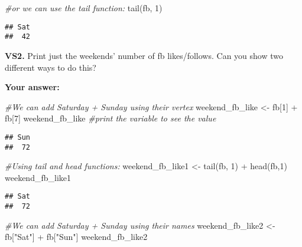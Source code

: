 \documentclass[
]{article}
\newenvironment{Shaded}{\begin{snugshade}}{\end{snugshade}}
\newcommand{\CommentTok}[1]{\textcolor[rgb]{0.56,0.35,0.01}{\textit{#1}}}
\newcommand{\DecValTok}[1]{\textcolor[rgb]{0.00,0.00,0.81}{#1}}
\newcommand{\FunctionTok}[1]{\textcolor[rgb]{0.00,0.00,0.00}{#1}}
\newcommand{\NormalTok}[1]{#1}
\newcommand{\OtherTok}[1]{\textcolor[rgb]{0.56,0.35,0.01}{#1}}
\newcommand{\SpecialCharTok}[1]{\textcolor[rgb]{0.00,0.00,0.00}{#1}}
\newcommand{\StringTok}[1]{\textcolor[rgb]{0.31,0.60,0.02}{#1}}
\begin{document}
\begin{Shaded}
\begin{Highlighting}[]
\CommentTok{\#or we can use the tail function:}
\FunctionTok{tail}\NormalTok{(fb, }\DecValTok{1}\NormalTok{)}
\end{Highlighting}
\end{Shaded}

\begin{verbatim}
## Sat 
##  42
\end{verbatim}

\textbf{VS2.} Print just the weekends' number of fb likes/follows. Can
you show two different ways to do this?

\textbf{Your answer:}

\begin{Shaded}
\begin{Highlighting}[]
\CommentTok{\#We can add Saturday + Sunday using their vertex}
\NormalTok{weekend\_fb\_like }\OtherTok{\textless{}{-}}\NormalTok{ fb[}\DecValTok{1}\NormalTok{] }\SpecialCharTok{+}\NormalTok{ fb[}\DecValTok{7}\NormalTok{]}
\NormalTok{weekend\_fb\_like }\CommentTok{\#print the variable to see the value}
\end{Highlighting}
\end{Shaded}

\begin{verbatim}
## Sun 
##  72
\end{verbatim}

\begin{Shaded}
\begin{Highlighting}[]
\CommentTok{\#Using tail and head functions:}
\NormalTok{weekend\_fb\_like1 }\OtherTok{\textless{}{-}} \FunctionTok{tail}\NormalTok{(fb, }\DecValTok{1}\NormalTok{) }\SpecialCharTok{+} \FunctionTok{head}\NormalTok{(fb,}\DecValTok{1}\NormalTok{)}
\NormalTok{weekend\_fb\_like1}
\end{Highlighting}
\end{Shaded}

\begin{verbatim}
## Sat 
##  72
\end{verbatim}

\begin{Shaded}
\begin{Highlighting}[]
\CommentTok{\#We can add Saturday + Sunday using their names}
\NormalTok{weekend\_fb\_like2 }\OtherTok{\textless{}{-}}\NormalTok{ fb[}\StringTok{"Sat"}\NormalTok{] }\SpecialCharTok{+}\NormalTok{ fb[}\StringTok{"Sun"}\NormalTok{]}
\NormalTok{weekend\_fb\_like2}
\end{Highlighting}
\end{Shaded}
\end{document}
